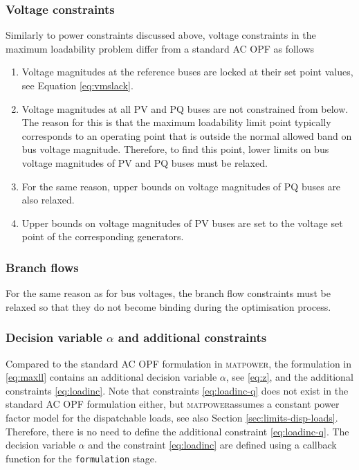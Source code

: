 \documentclass[12pt,a4]{article}
\newcommand*{\codemat}[1]{\texttt{#1}}
\newcommand*{\matpower}{\textsc{matpower}}
\begin{document}
\subsubsection{Voltage constraints}
\label{sec:volt-constr-at}
Similarly to power constraints discussed above, voltage constraints in the maximum loadability problem differ from a standard AC OPF as follows
\begin{enumerate}
\item Voltage magnitudes at the reference buses are locked at their set point values, see Equation \eqref{eq:vmslack}.
\item Voltage magnitudes at all PV and PQ buses are not constrained from below. The reason for this is that the maximum loadability limit point typically corresponds to an operating point that is outside the normal allowed band on bus voltage magnitude. Therefore, to find this point, lower limits on bus voltage magnitudes of PV and PQ buses must be relaxed.
\item For the same reason, upper bounds on voltage magnitudes of PQ buses are also relaxed.
\item Upper bounds on voltage magnitudes of PV buses are set to the voltage set point of the corresponding generators.
\end{enumerate}

\subsubsection{Branch flows}
\label{sec:branch-flows}

For the same reason as for bus voltages, the branch flow constraints must be relaxed so that they do not become binding during the optimisation process.

\subsubsection{Decision variable $\alpha$ and additional constraints}
\label{sec:defin-vari-alpha}

Compared to the standard AC OPF formulation in \matpower, the formulation in \eqref{eq:maxll} contains an additional decision variable $\alpha$, see \eqref{eq:z}, and the additional constraints \eqref{eq:loadinc}.
Note that constraints \eqref{eq:loadinc-q} does not exist in the standard AC OPF formulation either, but \matpower assumes a constant power factor model for the dispatchable loads, see also Section \ref{sec:limits-disp-loads}.
Therefore, there is no need to define the additional constraint \eqref{eq:loadinc-q}.
The decision variable $\alpha$ and the constraint \eqref{eq:loadinc} are defined using a callback function for the \codemat{formulation} stage.
\end{document}
